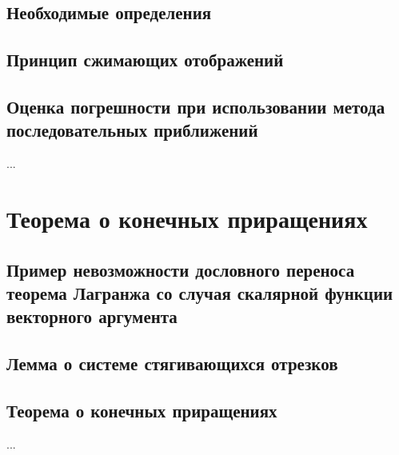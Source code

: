 \subsection{Необходимые определения}
\subsection{Принцип сжимающих отображений}
\subsection{Оценка погрешности при использовании метода последовательных приближений}
...

\section{Теорема о конечных приращениях}
\subsection{Пример невозможности дословного переноса теорема Лагранжа со случая скалярной функции векторного аргумента}
\subsection{Лемма о системе стягивающихся отрезков}
\subsection{Теорема о конечных приращениях}
...

